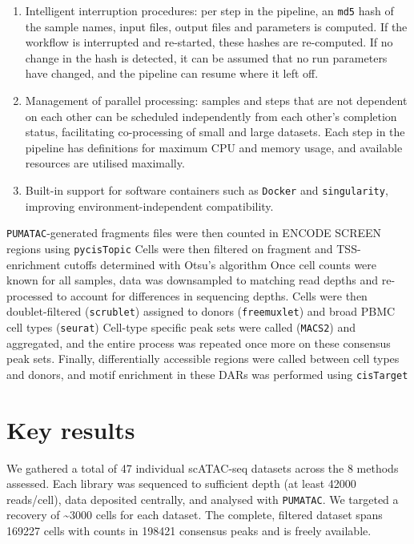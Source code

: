 \begin{enumerate}[noitemsep]
	\item Intelligent interruption procedures: per step in the pipeline, an \verb|md5| hash of the sample names, input files, output files and parameters is computed. If the workflow is interrupted and re-started, these hashes are re-computed. If no change in the hash is detected, it can be assumed that no run parameters have changed, and the pipeline can resume where it left off.
	\item Management of parallel processing: samples and steps that are not dependent on each other can be scheduled independently from each other's completion status, facilitating co-processing of small and large datasets. Each step in the pipeline has definitions for maximum CPU and memory usage, and available resources are utilised maximally.
	\item Built-in support for software containers such as \verb|Docker| and \verb|singularity|, improving environment-independent compatibility.
\end{enumerate}

\verb|PUMATAC|-generated fragments files were then counted in ENCODE SCREEN regions using \verb|pycisTopic| Cells were then filtered on fragment and TSS-enrichment cutoffs determined with Otsu's algorithm Once cell counts were known for all samples, data was downsampled to matching read depths and re-processed to account for differences in sequencing depths. Cells were then doublet-filtered (\verb|scrublet|) assigned to donors (\verb|freemuxlet|) and broad PBMC cell types (\verb|seurat|) Cell-type specific peak sets were called (\verb|MACS2|) and aggregated, and the entire process was repeated once more on these consensus peak sets. Finally, differentially accessible regions were called between cell types and donors, and motif enrichment in these DARs was performed using \verb|cisTarget|

\section{Key results}
We gathered a total of 47 individual scATAC-seq datasets across the 8 methods assessed. Each library was sequenced to sufficient depth (at least \num{42000} reads/cell), data deposited centrally, and analysed with \verb|PUMATAC|. We targeted a recovery of \textasciitilde{3000} cells for each dataset. The complete, filtered dataset spans \num{169227} cells with counts in \num{198421} consensus peaks and is freely available.

